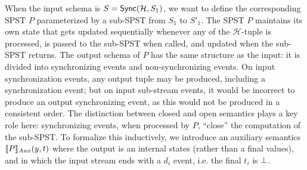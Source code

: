 When the input schema is $S=\hier{\mathcal{H}}{S_1}$, we want to
define the corresponding SPST $P$ parameterized by a sub-SPST from
$S_1$ to $S'_1$.
The SPST $P$ maintains its own state that gets updated sequentially
whenever any of the $\mathcal{H}$-tuple is processed,
is passed to the sub-SPST when called, and updated when the sub-SPST returns.
The output schema of $P$ has the same structure as the input:
it is divided into synchronizing events and non-synchronizing events.
On input synchronization events, any output tuple may be produced,
including a synchronization event; but on input sub-stream events, it would be incorrect
to produce an output synchronizing event, as this would not be produced in a consistent order.
The distinction between closed and open
semantics plays a key role here:
synchronizing events, when processed by $P$, ``close'' the computation of the sub-SPST.
To formalize this inductively,
we introduce an auxiliary semantics $\spstsemI{y}{t}{P}$
where the output is an internal states (rather than a final values),
and in which the input stream ends with a $d_i$ event,
i.e. the final $t_i$ is $\spsemp{}$.

